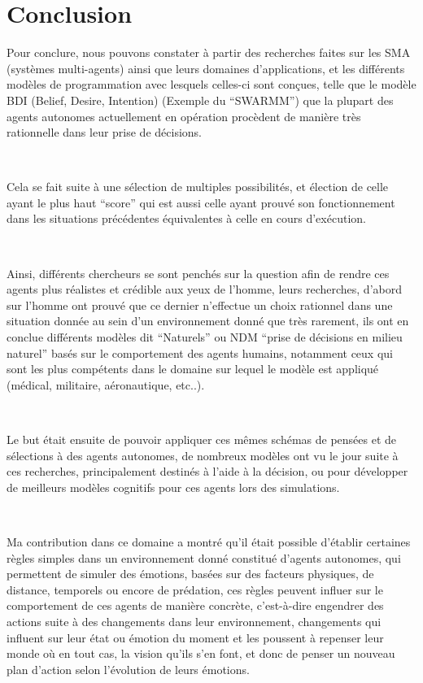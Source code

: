 \chapter{Conclusion} %

\label{Chapter7} %

Pour conclure, nous pouvons constater à partir des recherches faites sur les SMA (systèmes multi-agents) ainsi que leurs domaines d’applications, et les différents modèles de programmation avec lesquels celles-ci sont conçues, telle que le modèle BDI (Belief, Desire, Intention) (Exemple du “SWARMM”) que la plupart des agents autonomes  actuellement en opération procèdent de manière très rationnelle dans leur prise de décisions.

~\par
Cela se fait suite à une sélection de multiples possibilités, et élection de celle ayant le plus haut “score” qui est aussi celle ayant prouvé son fonctionnement dans les situations précédentes équivalentes à celle en cours d'exécution.

~\par
Ainsi, différents chercheurs se sont penchés sur la question afin de rendre ces agents plus réalistes et crédible aux yeux de l’homme, leurs recherches, d’abord sur l’homme ont prouvé que ce dernier n'effectue un choix rationnel dans une situation donnée au sein d’un environnement donné que très rarement, ils ont en conclue différents modèles dit “Naturels” ou NDM “prise de décisions en milieu naturel” basés sur le comportement des agents humains, notamment ceux qui sont les plus compétents dans le domaine sur lequel le modèle est appliqué (médical, militaire, aéronautique, etc..).

~\par
Le but était ensuite de pouvoir appliquer ces mêmes schémas de pensées et de sélections à des agents autonomes, de nombreux modèles ont vu le jour suite à ces recherches, principalement destinés à l’aide à la décision, ou pour développer de meilleurs modèles cognitifs pour ces agents lors des simulations.

~\par
Ma contribution dans ce domaine a montré qu’il était possible d’établir certaines règles simples dans un environnement donné constitué d’agents autonomes, qui permettent de simuler des émotions, basées sur des facteurs physiques, de distance, temporels ou encore de prédation, ces règles peuvent influer sur le comportement de ces agents de manière concrète, c’est-à-dire engendrer des actions suite à des changements dans leur environnement, changements qui influent sur leur état ou émotion du moment et les poussent à repenser leur monde où en tout cas, la vision qu’ils s’en font, et donc de penser un nouveau plan d’action selon l’évolution de leurs émotions.

